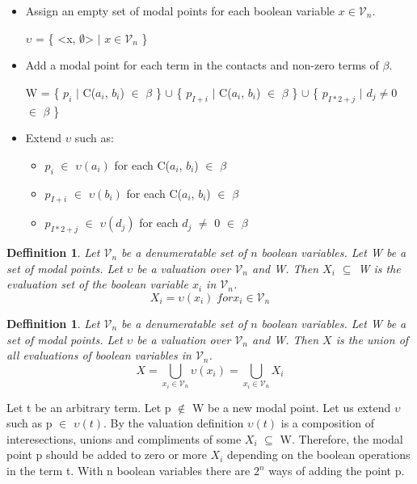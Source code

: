 \documentclass{article}
\newcommand\V{\mathcal{V}}
\newcommand\VXi{X_i}
\newcommand\VX{X}
\newtheorem{defn}[theorem]{Deffinition}
\begin{document}
		\begin{itemize}
			\item Assign an empty set of modal points for each boolean variable $x \in \V_n$.
	
			$\upsilon$ = \{ <x, $\emptyset$> $\mid$ $ x \in \V_n$ \}
			
			\item Add a modal point for each term in the contacts and non-zero terms of $\beta$. 
			
			W = \{ $p_i$ $\mid$ C($a_i$, $b_i$) $\in$ $\beta$ \} $\cup$ \{ $p_{I+i}$ $\mid$ C($a_i$, $b_i$) $\in$ $\beta$ \} $\cup$ \{ $p_{I*2+j}$ $\mid$ $d_j \neq 0$ $\in$ $\beta$ \}
						
			\item Extend $\upsilon$ such as:
			
			\begin{itemize}
				\item $p_i$ $\in$ $\upsilon(a_i)$ for each C($a_i$, $b_i$) $\in$ $\beta$ 
				\item $p_{I+i}$ $\in$ $\upsilon(b_i)$ for each C($a_i$, $b_i$) $\in$ $\beta$ 
				\item $p_{I*2+j}$ $\in$ $\upsilon(d_j)$ for each $d_j$  $\neq$ 0 $\in$ $\beta$ 
			\end{itemize}
		\end{itemize}
				
		\begin{defn}
			Let $\V_n$ be a denumeratable set of $n$ boolean variables. Let W be a set of modal points. Let $\upsilon$ be a valuation over $\V_n$ and W. Then $\VXi$ $\subseteq$ W is the evaluation set of the boolean variable $x_i$ in $\V_n$.
			\begin{equation}
				\VXi = \upsilon(x_i) \;for x_i \in \V_n
			\end{equation}
		\end{defn}
		
		\begin{defn}
			Let $\V_n$ be a denumeratable set of $n$ boolean variables. Let W be a set of modal points. Let $\upsilon$ be a valuation over $\V_n$ and W. 
			Then $\VX$ is the union of all evaluations of boolean variables in $\V_n$.
			\begin{equation}
				\VX = \bigcup\limits_{x_i \in \V_n}\upsilon(x_i) = \bigcup\limits_{x_i \in \V_n}\VXi
			\end{equation}
		\end{defn}
		
		Let t be an arbitrary term. Let p $\notin$ W be a new modal point. Let us extend $\upsilon$ such as p $\in$ $\upsilon(t)$. By the valuation definition  $\upsilon(t)$ is a composition of interesections, unions and compliments of some $\VXi$ $\subseteq$ W. Therefore, the modal point p should be added to zero or more $\VXi$ depending on the boolean operations in the term t. With n boolean variables there are $2^n$ ways of adding the point p.
		
\end{document}
